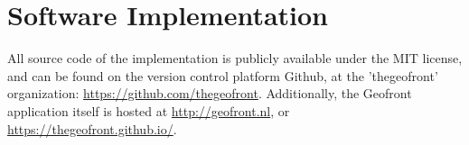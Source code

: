 \appendix
\chapter{Software Implementation}

All source code of the implementation is publicly available under the MIT license, and can be found on the version control platform Github, at the 'thegeofront' organization: \url{https://github.com/thegeofront}.
Additionally, the Geofront application itself is hosted at \url{http://geofront.nl}, or \url{https://thegeofront.github.io/}.
